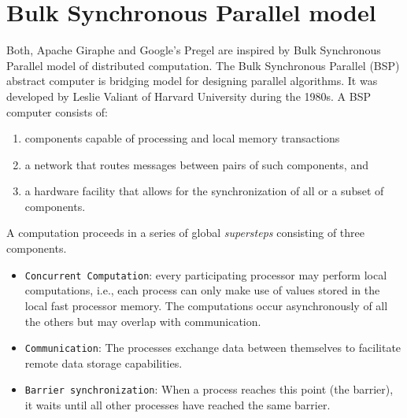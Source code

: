\documentclass[letterpaper,twocolumn,10pt]{article}
\begin{document}
\section{Bulk Synchronous Parallel model}
\label{sec:bsp}
Both, Apache Giraphe and Google's Pregel are inspired by Bulk Synchronous Parallel model of distributed computation.
The Bulk Synchronous Parallel (BSP) abstract computer is bridging model for designing parallel algorithms. It was developed by Leslie Valiant of Harvard University during the 1980s. A BSP computer consists of:
\begin{enumerate}
\item components capable of processing and local memory transactions
\item a network that routes messages between pairs of such components, and
\item a hardware facility that allows for the synchronization of all or a subset of components.
\end{enumerate}
A computation proceeds in a series of global \textit{supersteps} consisting of three components.
\begin{itemize}
\item {\tt Concurrent Computation}: every participating processor may perform local computations, i.e., each process can only make use of values stored in the local fast processor memory. The computations occur asynchronously of all the others but may overlap with communication.
\item {\tt Communication}: The processes exchange data between themselves to facilitate remote data storage capabilities.
\item {\tt Barrier synchronization}: When a process reaches this point (the barrier), it waits until all other processes have reached the same barrier.
\end{itemize}
{\footnotesize 
}


\theendnotes
\end{document}
